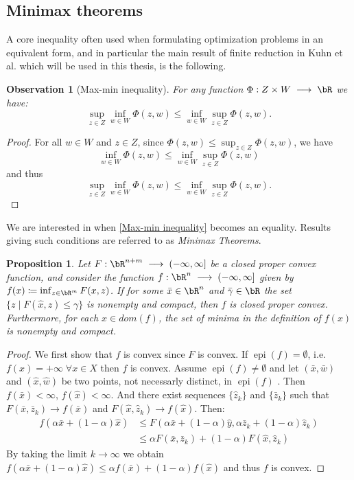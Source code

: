 \documentclass[11pt,a4paper,oneside,openany]{book}
\DeclareMathOperator{\epi}{epi}
\newtheorem{prop}[theorem]{Proposition}
\newtheorem{observation}[theorem]{Observation}
\numberwithin{definition}{section}
\numberwithin{theorem}{section}
\numberwithin{problem}{section}
\newcommand{\la}{\; \longrightarrow \;}
\begin{document}
\subsection{Minimax theorems}

A core inequality often used when formulating optimization problems in an equivalent form, and in particular the main result of finite reduction in Kuhn et al. \cite{distibRobWasserstein} which will be used in this thesis, is the following.
\begin{observation}[Max-min inequality] For any function $\Phi:Z \times W \la \bR$ we have: 
    \begin{equation}
        \sup_{z \in Z}\inf_{w \in W}\Phi(z,w) \leq \inf_{w \in W}\sup_{z \in Z}\Phi(z,w).\label{Max-min inequality}
    \end{equation}
\end{observation}
\begin{proof}
   For all \( w \in W \) and \( z \in Z \), since \( \Phi(z,w) \leq \sup_{z\in Z} \Phi(z,w) \), we have 
\[ \inf_{w \in W} \Phi(z,w) \leq \inf_{w \in W} \sup_{z\in Z} \Phi(z,w) \]
and thus
\[ \sup_{z \in Z} \inf_{w \in W} \Phi(z,w) \leq \inf_{w \in W} \sup_{z\in Z} \Phi(z,w). \]
\end{proof}

We are interested in when \eqref{Max-min inequality} becomes an equality. Results giving such conditions are referred to as \emph{Minimax Theorems}. 
 

\begin{prop} \label{partial mininimization properness}
    Let $F: \bR^{n+m} \la (-\infty,\infty]$ be a closed proper convex function, and consider the function $f: \bR^n \la (-\infty,\infty]$ given by $f(x) \coloneqq \inf_{z \in\bR^m}F(x,z)$. If for some $\bar x \in \bR^n$ and $\bar \gamma \in \bR$ the set \(\{ z \mid F(\hat x,z) \leq \gamma\}\) is nonempty and compact, then $f$ is closed proper convex. Furthermore, for each $x \in dom(f)$, the set of minima in the definition of $f(x)$ is nonempty and compact. 

\end{prop}
\begin{proof}
    We first show that $f$ is convex since $F$ is convex. If \(\epi(f) = \emptyset \), i.e. $f(x) = +\infty\; \forall x \in X$ then $f$ is convex. Assume $\epi(f) \neq \emptyset$ and let  \( (\bar x, \bar w)\) and \( (\hat x, \hat w)\) be two points, not necessarly distinct, in $\epi(f)$ . Then $f(\bar x) < \infty$, $f(\hat x) < \infty $. And there exist sequences \(\{\hat z_k\}\) and \(\{\bar z_k\}\) such that \(F(\bar x, \bar z_k) \to f(\bar x)\) and \(F(\hat x, \hat z_k) \to f(\hat x)\). Then:
    \begin{align*}
        f(\alpha \bar x + (1-\alpha) \hat x) &\leq F(\alpha \bar x + (1-\alpha) \hat y, \alpha \bar z_k  + (1-\alpha) \hat z_k) \\ 
        &\leq \alpha F(\bar x, \bar z_k) + (1- \alpha) F(\hat x, \hat z_k)
     \end{align*}
    By taking the limit $k \to \infty$ we obtain $f(\alpha \bar x + (1- \alpha) \hat x) \leq \alpha f(\bar x) + (1-\alpha) f(\hat x)$ and thus $f$ is convex.
\end{proof}
\end{document}
